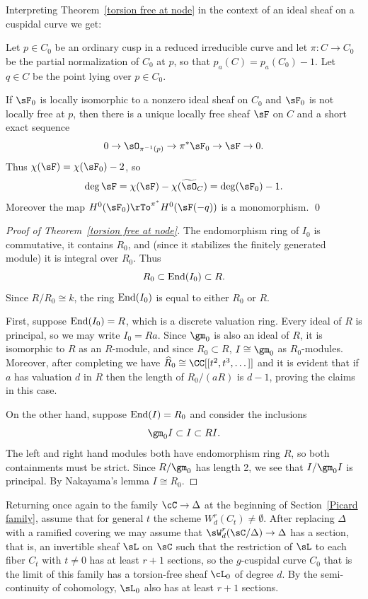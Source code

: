 Interpreting Theorem~\ref{torsion free at node} in the context of an ideal sheaf on a cuspidal curve
we get:

\begin{corollary}
Let $p\in C_{0}$ be an ordinary cusp in a reduced irreducible curve and let $\pi:C \to C_{0}$ be 
the partial normalization of $C_{0}$ at $p$, so that $p_a(C) = p_a(C_{0}) -1$.
Let $q\in C$ be the point lying over $p\in C_{0}$.

If $\sF_0$ is locally
isomorphic to a nonzero ideal sheaf on $C_{0}$
and $\sF_0$ is not locally free at $p$, then there is 
a unique locally free sheaf $\sF$ on $C$ and a short exact sequence
$$
0\to \sO_{\pi^{-1}(p)} \to \pi^{*} \sF_{0} \to \sF \to 0.
$$
Thus $\chi(\sF) = \chi(\sF_{0}) -2$, so 
$$
\deg \sF = \chi(\sF) - \chi(\widetilde \sO_{C}) = 
\deg(\sF_{0})-1.
$$
Moreover the map $H^{0}(\sF_{0}) \rTo^{\pi^{*}} H^{0}(\sF(-q))$ is a monomorphism. 
\qed
\end{corollary}

\begin{proof}[Proof of Theorem~\ref{torsion free at node}] 

\def\End{{\rm End}}

The endomorphism ring of $I_0$ is commutative, it contains $R_0$,  and (since it stabilizes the finitely
generated module) it is integral over $R_0$. Thus
$$
R_0 \subset \End(I_0) \subset R.
$$
Since
$R/R_0 \cong k$, the ring $\End(I_0)$ is equal to either 
$R_0$ or $R$. 

First, suppose
$\End(I_{0})=R$, which is a discrete valuation ring. Every ideal of $R$ is principal, so we may write $I_{0} = Ra$.
 Since $\gm_0$ is also an ideal of $R$, it is isomorphic to $R$
as an $R$-module, and since $R_0\subset R$,
$I \cong \gm_0$ as $R_0$-modules. Moreover, after completing we have $\widehat R_{0} \cong \CC[[t^{2}, t^{3}, \dots]]$ and it is evident that if $a$ has valuation $d$ in $R$ then the length of $R_{0}/(aR)$ is $d-1$, proving the claims in this case.

On the other hand, suppose
$\End(I)=R_0$
 and consider the inclusions
$$
\gm_0 I \subset I \subset R I.
$$
The left and right hand modules both have endomorphism ring $R$,
so both containments must be strict. Since $R/\gm_0$ has length 2,
we see that $I/\gm_0 I$ is principal. By Nakayama's lemma $I\cong R_0$.
\end{proof}

Returning once again to the family $\cC \to \Delta$ at the beginning of Section~\ref{Picard family}, assume that for general $t$ the scheme $W^{r}_{d}(C_t)\neq \emptyset$. After replacing $\Delta$ with a ramified covering
we may assume that $\sW^{r}_{d}(\sC/\Delta) \to \Delta$ has a section, that is, an invertible sheaf $\sL$ on $\sC$
 such that the restriction of $\sL$ to each fiber $C_{t}$ with $t\neq 0$ has at least $r+1$ sections, so the $g$-cuspidal curve $C_0$ that is the limit of this family has a torsion-free sheaf $\cL_0$ of degree $d$. By the semi-continuity
 of cohomology, $\sL_{0}$ also has at least $r+1$ sections. 

